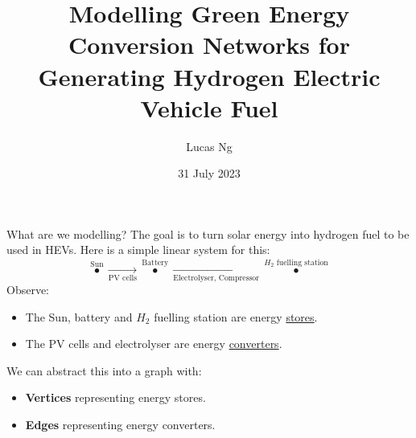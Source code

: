 \documentclass{beamer}
\title{Modelling Green Energy Conversion Networks for Generating Hydrogen Electric Vehicle Fuel}
\author{Lucas Ng}
\institute{University of Cambridge}
\date{31 July 2023}
\begin{document}
\frame{\titlepage}


\begin{frame}{What are we modelling?}
    The goal is to turn solar energy into hydrogen fuel to be used in HEVs. Here is a simple linear system for this:
    $$\overset{\text{Sun}}{\bullet} \xrightarrow[\text{PV cells}]{} \overset{\text{Battery}}{\bullet} \xrightarrow[\text{Electrolyser,\ Compressor}]{} \overset{H_{2} \text{ fuelling station}}{\bullet}$$
    Observe:
    \begin{itemize}
        \item The Sun, battery and $H_2$ fuelling station are energy \underline{stores}.
        \item The PV cells and electrolyser are energy \underline{converters}.
    \end{itemize}
    We can abstract this into a graph with:
    \begin{itemize}
        \item \textbf{Vertices} representing energy stores.
        \item \textbf{Edges} representing energy converters.
    \end{itemize}
\end{frame}
\end{document}
